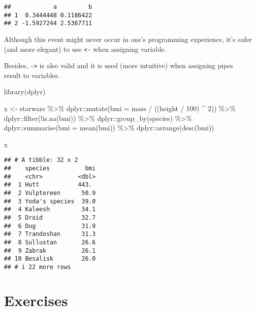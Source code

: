 \documentclass[
  oneside]{book}
\newenvironment{Shaded}{\begin{snugshade}}{\end{snugshade}}
\newcommand{\AttributeTok}[1]{\textcolor[rgb]{0.77,0.63,0.00}{#1}}
\newcommand{\DecValTok}[1]{\textcolor[rgb]{0.00,0.00,0.81}{#1}}
\newcommand{\FunctionTok}[1]{\textcolor[rgb]{0.00,0.00,0.00}{#1}}
\newcommand{\NormalTok}[1]{#1}
\newcommand{\OtherTok}[1]{\textcolor[rgb]{0.56,0.35,0.01}{#1}}
\newcommand{\SpecialCharTok}[1]{\textcolor[rgb]{0.00,0.00,0.00}{#1}}
\begin{document}
\begin{verbatim}
##            a         b
## 1  0.3444448 0.1186422
## 2 -1.5927244 2.5367711
\end{verbatim}

Although this event might never occur in one's programming experience, it's
safer (and more elegant) to use \texttt{\textless{}-} when assigning variable.

Besides, \texttt{-\textgreater{}} is also valid and it is used (more intuitive) when assigning pipes
result to variables.

\begin{Shaded}
\begin{Highlighting}[]
\FunctionTok{library}\NormalTok{(dplyr)}

\NormalTok{x }\OtherTok{\textless{}{-}}\NormalTok{ starwars }\SpecialCharTok{\%\textgreater{}\%}
\NormalTok{  dplyr}\SpecialCharTok{::}\FunctionTok{mutate}\NormalTok{(}\AttributeTok{bmi =}\NormalTok{ mass }\SpecialCharTok{/}\NormalTok{ ((height }\SpecialCharTok{/} \DecValTok{100}\NormalTok{) }\SpecialCharTok{\^{}} \DecValTok{2}\NormalTok{)) }\SpecialCharTok{\%\textgreater{}\%}
\NormalTok{  dplyr}\SpecialCharTok{::}\FunctionTok{filter}\NormalTok{(}\SpecialCharTok{!}\FunctionTok{is.na}\NormalTok{(bmi)) }\SpecialCharTok{\%\textgreater{}\%}
\NormalTok{  dplyr}\SpecialCharTok{::}\FunctionTok{group\_by}\NormalTok{(species) }\SpecialCharTok{\%\textgreater{}\%}
\NormalTok{  dplyr}\SpecialCharTok{::}\FunctionTok{summarise}\NormalTok{(}\AttributeTok{bmi =} \FunctionTok{mean}\NormalTok{(bmi)) }\SpecialCharTok{\%\textgreater{}\%}
\NormalTok{  dplyr}\SpecialCharTok{::}\FunctionTok{arrange}\NormalTok{(}\FunctionTok{desc}\NormalTok{(bmi))}

\NormalTok{x}
\end{Highlighting}
\end{Shaded}

\begin{verbatim}
## # A tibble: 32 x 2
##    species          bmi
##    <chr>          <dbl>
##  1 Hutt           443. 
##  2 Vulptereen      50.9
##  3 Yoda's species  39.0
##  4 Kaleesh         34.1
##  5 Droid           32.7
##  6 Dug             31.9
##  7 Trandoshan      31.3
##  8 Sullustan       26.6
##  9 Zabrak          26.1
## 10 Besalisk        26.0
## # i 22 more rows
\end{verbatim}

\hypertarget{exercises}{%
\section{Exercises}\label{exercises}}
\end{document}
